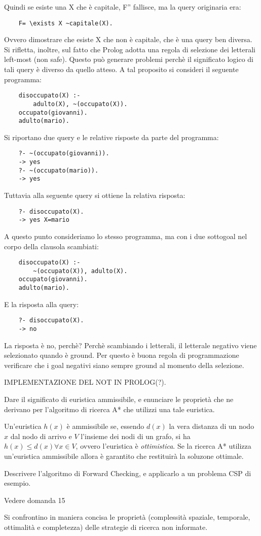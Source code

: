 \documentclass[answers, a4paper, 11pt]{exam}
\begin{document}
\begin{questions}
\begin{solution}
  Quindi se esiste una X che è capitale, F'' fallisce, ma la query originaria era:
  \begin{verbatim}
    F= \exists X ~capitale(X).
  \end{verbatim}
  Ovvero dimostrare che esiste X che non è capitale, che è una query ben diversa.
  Si rifletta, inoltre, sul fatto che Prolog adotta una regola di selezione dei letterali left-most (non safe). Questo può generare problemi perchè il significato logico di tali query è diverso da quello atteso.
  A tal proposito si consideri il seguente programma:
  \begin{verbatim}
    disoccupato(X) :- 
        adulto(X), ~(occupato(X)).
    occupato(giovanni).
    adulto(mario).
  \end{verbatim}
  Si riportano due query e le relative risposte da parte del programma:
  \begin{verbatim}
    ?- ~(occupato(giovanni)).
    -> yes
    ?- ~(occupato(mario)).
    -> yes
  \end{verbatim}
  Tuttavia alla seguente query si ottiene la relativa risposta:
  \begin{verbatim}
    ?- disoccupato(X).
    -> yes X=mario
  \end{verbatim}
  A questo punto consideriamo lo stesso programma, ma con i due sottogoal nel corpo della clausola scambiati:
  \begin{verbatim}
    disoccupato(X) :- 
        ~(occupato(X)), adulto(X).
    occupato(giovanni).
    adulto(mario).
  \end{verbatim}
  E la risposta alla query:
  \begin{verbatim}
    ?- disoccupato(X).
    -> no
  \end{verbatim}
  La risposta è no, perchè? Perchè scambiando i letterali, il letterale negativo viene selezionato quando è ground.
  Per questo è buona regola di programmazione verificare che i goal negativi siano sempre ground al momento della selezione.

  IMPLEMENTAZIONE DEL NOT IN PROLOG(?).
    \end{solution}

\question Dare il significato di euristica ammissibile, e enunciare le proprietà che ne derivano per l’algoritmo
di ricerca A* che utilizzi una tale euristica.
	\begin{solution}
		Un'euristica $h(x)$ è ammissibile se, essendo $d(x)$ la vera distanza di un nodo $x$ dal nodo di arrivo e $V$ l'insieme dei nodi di un grafo, si ha $h(x) \leq d(x) \forall x \in V$, ovvero l'euristica è \emph{ottimistica}. 
		Se la ricerca A* utilizza un'euristica ammissibile allora è garantito che restituirà la soluzone ottimale. 
	\end{solution}
\question Descrivere l’algoritmo di Forward Checking, e applicarlo a un problema CSP di esempio.
\begin{solution}
  Vedere domanda 15
\end{solution}
\question Si confrontino in maniera concisa le proprietà (complessità spaziale, temporale, ottimalità e
completezza) delle strategie di ricerca non informate.


\end{questions}
\end{document}
